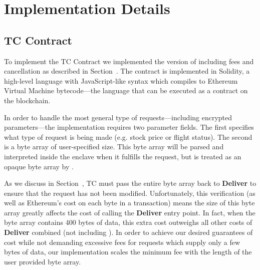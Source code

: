 \section{\tc Implementation Details}
\label{sec:impl}

\subsection{TC Contract}

To implement the TC Contract we implemented the version of \tcont including fees and cancellation as described in Section~.
The contract is implemented in Solidity, a high-level language with JavaScript-like syntax which compiles to Ethereum Virtual Machine bytecode---the language that can be executed as a contract on the blockchain.

In order to handle the most general type of requests---including encrypted parameters---the \tcont implementation requires two parameter fields.
The first specifies what type of request is being made (e.g. stock price or flight status).
The second is a byte array of user-specified size.
This byte array will be parsed and interpreted inside the enclave when it fulfills the request, but is treated as an opaque byte array by \tcont.

As we discuss in Section~, TC must pass the entire byte array back to {\bf Deliver} to ensure that the request has not been modified.
Unfortunately, this verification (as well as Ethereum's cost on each byte in a transaction) means the size of this byte array greatly affects the cost of calling the {\bf Deliver} entry point.
In fact, when the byte array contains 400 bytes of data, this extra cost outweighs all other costs of {\bf Deliver} combined (not including \dgcallback).
In order to achieve our desired guarantees of cost while not demanding excessive fees for requests which supply only a few bytes of data,
our implementation scales the minimum fee with the length of the user provided byte array.



